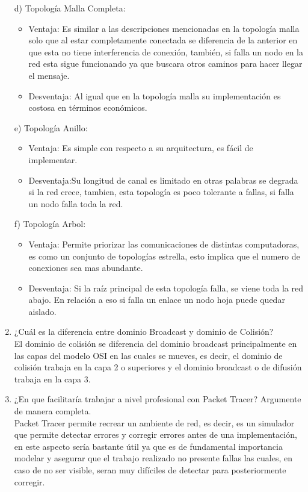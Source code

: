 \documentclass[spanish]{udpreport}
\begin{document}
\begin{enumerate}
\begin{itemize}
    \end{itemize}
    d) Topología Malla Completa:
    \begin{itemize}
        \item Ventaja: Es similar a las descripciones mencionadas en la topología malla solo que al estar completamente conectada se diferencia de la anterior en que esta no tiene interferencia de conexión, también, si falla un nodo en la red esta sigue funcionando ya que buscara otros caminos para hacer llegar el mensaje. 
        \item Desventaja: Al igual que en la topología malla su implementación es costosa en términos económicos.
    \end{itemize}
    e) Topología Anillo:
    \begin{itemize}
        \item Ventaja: Es simple con respecto a su arquitectura, es fácil de implementar. 
        \item Desventaja:Su longitud de canal es limitado en otras palabras se degrada si la red crece, tambien, esta topología es poco tolerante a fallas, si falla un nodo falla toda la red. 
    \end{itemize}
    \newpage
    f) Topología Arbol:
    \begin{itemize}
        \item Ventaja: Permite priorizar las comunicaciones de distintas computadoras, es como un conjunto de topologías estrella, esto implica que el numero de conexiones sea mas abundante. 
        \item Desventaja: Si la raíz principal de esta topología falla, se viene toda la red abajo. En relación a eso si falla un enlace un nodo hoja puede quedar aislado.
    \end{itemize}
    \item ¿Cuál es la diferencia entre dominio Broadcast y dominio de Colisión?
    \\El dominio de colisión se diferencia del dominio broadcast principalmente en las capas del modelo OSI en las cuales se mueves, es decir, el dominio de colisión trabaja en la capa 2 o superiores y el dominio broadcast o de difusión trabaja en la capa 3.
    \item¿En que facilitaría trabajar a nivel profesional con Packet Tracer? Argumente de manera completa.
    \\ Packet Tracer permite recrear un ambiente de red, es decir, es un simulador que permite detectar errores y corregir errores antes de una implementación, en este aspecto sería bastante útil ya que es de fundamental importancia modelar y asegurar que el trabajo realizado no presente fallas las cuales, en caso de no ser visible, seran muy difíciles de detectar para posteriormente corregir. 

\end{enumerate}
\end{document}

